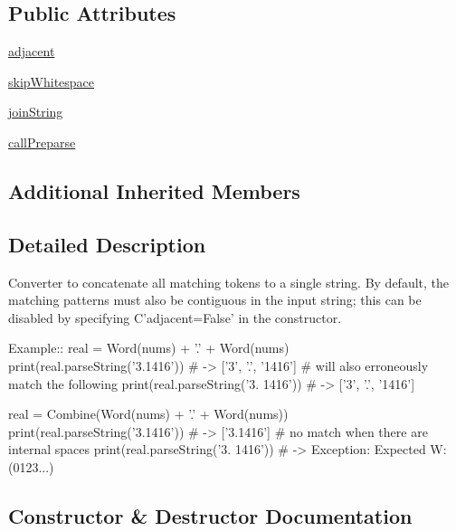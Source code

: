 \subsection*{Public Attributes}
\begin{DoxyCompactItemize}
\item 
\hyperlink{classpkg__resources_1_1__vendor_1_1pyparsing_1_1Combine_a0e0abea5e887aee659e6bde5492dc299}{adjacent}
\item 
\hyperlink{classpkg__resources_1_1__vendor_1_1pyparsing_1_1Combine_a4a884d2357f17a68c1b3c478ca6885e6}{skip\+Whitespace}
\item 
\hyperlink{classpkg__resources_1_1__vendor_1_1pyparsing_1_1Combine_a1221cf58a85aadbcb96b25fcdc2ff505}{join\+String}
\item 
\hyperlink{classpkg__resources_1_1__vendor_1_1pyparsing_1_1Combine_a436a1ec3074f84feaa46942d708a43c8}{call\+Preparse}
\end{DoxyCompactItemize}
\subsection*{Additional Inherited Members}


\subsection{Detailed Description}
\begin{DoxyVerb}Converter to concatenate all matching tokens to a single string.
By default, the matching patterns must also be contiguous in the input string;
this can be disabled by specifying C{'adjacent=False'} in the constructor.

Example::
    real = Word(nums) + '.' + Word(nums)
    print(real.parseString('3.1416')) # -> ['3', '.', '1416']
    # will also erroneously match the following
    print(real.parseString('3. 1416')) # -> ['3', '.', '1416']

    real = Combine(Word(nums) + '.' + Word(nums))
    print(real.parseString('3.1416')) # -> ['3.1416']
    # no match when there are internal spaces
    print(real.parseString('3. 1416')) # -> Exception: Expected W:(0123...)
\end{DoxyVerb}
 

\subsection{Constructor \& Destructor Documentation}
\mbox{\label{classpkg__resources_1_1__vendor_1_1pyparsing_1_1Combine_ac486d333729481aca8d159b774785864}} 
